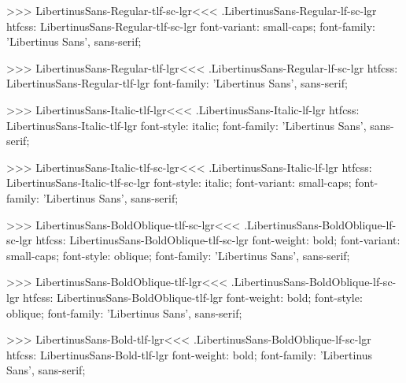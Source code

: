 >>>
\<LibertinusSans-Regular-tlf-sc-lgr\><<<
.LibertinusSans-Regular-lf-sc-lgr
htfcss:  LibertinusSans-Regular-tlf-sc-lgr  font-variant: small-caps; font-family: 'Libertinus Sans', sans-serif;

>>>
\<LibertinusSans-Regular-tlf-lgr\><<<
.LibertinusSans-Regular-lf-sc-lgr
htfcss:  LibertinusSans-Regular-tlf-lgr  font-family: 'Libertinus Sans', sans-serif;

>>>
\<LibertinusSans-Italic-tlf-lgr\><<<
.LibertinusSans-Italic-lf-lgr
htfcss:  LibertinusSans-Italic-tlf-lgr  font-style: italic; font-family: 'Libertinus Sans', sans-serif;

>>>
\<LibertinusSans-Italic-tlf-sc-lgr\><<<
.LibertinusSans-Italic-lf-lgr
htfcss:  LibertinusSans-Italic-tlf-sc-lgr  font-style: italic; font-variant: small-caps; font-family: 'Libertinus Sans', sans-serif;

>>>
\<LibertinusSans-BoldOblique-tlf-sc-lgr\><<<
.LibertinusSans-BoldOblique-lf-sc-lgr
htfcss:  LibertinusSans-BoldOblique-tlf-sc-lgr  font-weight: bold; font-variant: small-caps; font-style: oblique; font-family: 'Libertinus Sans', sans-serif;

>>>
\<LibertinusSans-BoldOblique-tlf-lgr\><<<
.LibertinusSans-BoldOblique-lf-sc-lgr
htfcss:  LibertinusSans-BoldOblique-tlf-lgr  font-weight: bold; font-style: oblique; font-family: 'Libertinus Sans', sans-serif;

>>>
\<LibertinusSans-Bold-tlf-lgr\><<<
.LibertinusSans-BoldOblique-lf-sc-lgr
htfcss:  LibertinusSans-Bold-tlf-lgr  font-weight: bold; font-family: 'Libertinus Sans', sans-serif;

